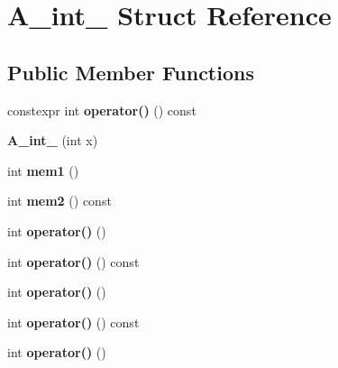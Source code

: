 \hypertarget{struct_a__int__0}{}\section{A\+\_\+int\+\_ Struct Reference}
\label{struct_a__int__0}
\subsection*{Public Member Functions}
\begin{DoxyCompactItemize}
\item 
\mbox{\label{struct_a__int__0_af7b6f2ac11e13c6124aa466285c641bd}} 
constexpr int {\bfseries operator()} () const
\item 
\mbox{\label{struct_a__int__0_a19c26f41fad7f48a915c9a2970aecd04}} 
{\bfseries A\+\_\+int\+\_} (int x)
\item 
\mbox{\label{struct_a__int__0_a34dd3945ba3f0241d42d1da750c56178}} 
int {\bfseries mem1} ()
\item 
\mbox{\label{struct_a__int__0_a76b24b6b63e6984f4d0bbb15f63e614f}} 
int {\bfseries mem2} () const
\item 
\mbox{\label{struct_a__int__0_a43edb19e6da76def9043a799b0934dc4}} 
int {\bfseries operator()} ()
\item 
\mbox{\label{struct_a__int__0_ad0dbf2321c52cd2178433426997d2c72}} 
int {\bfseries operator()} () const
\item 
\mbox{\label{struct_a__int__0_a43edb19e6da76def9043a799b0934dc4}} 
int {\bfseries operator()} ()
\item 
\mbox{\label{struct_a__int__0_ad0dbf2321c52cd2178433426997d2c72}} 
int {\bfseries operator()} () const
\item 
\mbox{\label{struct_a__int__0_a43edb19e6da76def9043a799b0934dc4}} 
int {\bfseries operator()} ()
\item 
\mbox{\label{struct_a__int__0_ad0dbf2321c52cd2178433426997d2c72}} 

\end{DoxyCompactItemize}
